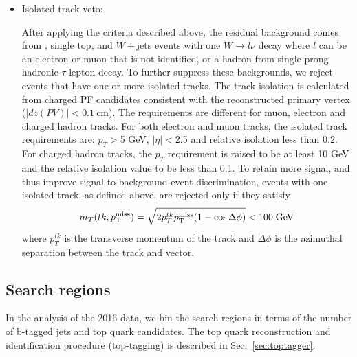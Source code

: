 \begin{itemize}
\item Isolated track veto:

After applying the criteria described above, the residual background comes from \ttbar, single top, and $W+$jets events with one $W\rightarrow l\nu$
decay where $l$ can be an electron or muon that is not identified, or a hadron from single-prong hadronic $\tau$ lepton decay. To further suppress these backgrounds, we reject events 
that have one or more isolated tracks. The track isolation
is calculated from charged PF candidates consistent with the 
reconstructed primary vertex ($|dz(PV)|<0.1~\mathrm{cm}$).
The requirements are different for muon, electron and charged hadron tracks.
For both electron and muon tracks, the isolated track requirements are: 
$p_{T}>$5 GeV, $|\eta|<$2.5 and relative isolation less than 0.2.
For charged hadron tracks, the $p_{T}$ requirement
is raised to be at least 10 GeV and the relative isolation value to be less 
than 0.1. To retain more signal, and thus improve signal-to-background
event discrimination, events with one isolated track, as defined
above, are rejected only if they satisfy
  \begin{equation}
    \label{eq:mt_isotk}
    m_T(tk,p^{\rm miss}_{\rm T}) = \sqrt{2p_{T}^{tk}p^{\rm miss}_{\rm T}(1-\cos\Delta\phi)}<100\;\mathrm{GeV}
  \end{equation}
  where $p_{T}^{tk}$ is the transverse momentum of the track and
  $\Delta\phi$ is the azimuthal separation between the track and \MET
  vector. 

\end{itemize}

\subsection{Search regions}
\label{sec:searchregions}

In the analysis of the 2016 data, we bin the search regions in terms of the number of b-tagged jets and top quark candidates. 
The top quark reconstruction and identification procedure (top-tagging) is described in Sec.~\ref{sec:toptagger}. 

